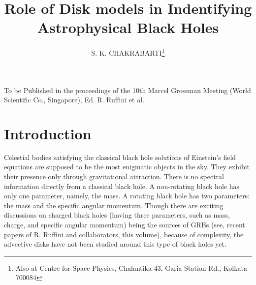 \documentclass{ws-procs975x65}
\begin{document}
\title{Role of Disk models in Indentifying Astrophysical Black Holes}

\author{S. K. CHAKRABARTI\footnote{\uppercase{A}lso at \uppercase{C}entre for 
\uppercase{S}pace \uppercase{P}hysics, \uppercase{C}halantika 43, \uppercase{G}aria 
\uppercase{S}tation \uppercase{R}d., \uppercase{K}olkata 700084}}

\address{S.N. Bose National Centre for Basic Sciences,\\
JD-Block, Salt Lake, Kolkata 700098, INDIA\\
E-mail: chakraba@bose.res.in\\ }

\maketitle


\noindent To be Published in the proceedings of the 10th Marcel Grossman Meeting (World Scientific Co., Singapore),
Ed. R. Ruffini et al.

\section{Introduction}

Celestial bodies satisfying the classical black hole solutions of Einstein's field equations
are supposed to be the most enigmatic objects in the sky. They exhibit their 
presence only through gravitational attraction. There is no 
spectral information directly from a classical black hole. A non-rotating 
black hole has only one parameter, namely, the mass. A rotating black hole
has two parameters: the mass and the specific angular momentum. Though there 
are exciting discussions on charged black holes (having three parameters, such as 
mass, charge, and specific angular momentum) being the sources of GRBs (see,
recent papers of R. Ruffini and collaborators, this volume), because of complexity, 
the advective disks have not been studied around this type of black holes yet.
\end{document}
